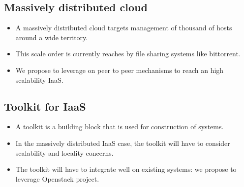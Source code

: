 \subsection{Massively distributed cloud}

\begin{itemize}

	\item A massively distributed cloud targets management of thousand of hosts around a wide territory.	
	
	\item This scale order is currently reaches by file sharing systems like bittorrent.

	\item We propose to leverage on peer to peer mechanisms to reach an high scalability IaaS.

\end{itemize}

\subsection{Toolkit for IaaS}

\begin{itemize}

	\item A toolkit is a building block that is used for construction of systems.

	\item In the massively distributed IaaS case, the toolkit will have to consider scalability and locality concerns.

	\item The toolkit will have to integrate well on existing systems: we propose to leverage Openstack project.

\end{itemize}
